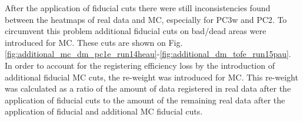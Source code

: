 After the application of fiducial cuts there were still inconsistencies found between the heatmaps of real data and MC, especially for PC3w and PC2. 
To circumvent this problem additional fiducial cuts on bad/dead areas were introduced for MC. 
These cuts are shown on Fig. \ref{fig:additional_mc_dm_pc1e_run14heau}-\ref{fig:additional_dm_tofe_run15pau}. 
In order to account for the registering efficiency loss by the introduction of additional fiducial MC cuts, the re-weight was introduced for MC. 
This re-weight was calculated as a ratio of the amount of data registered in real data after the application of fiducial cuts to the amount of the remaining real data after the application of fiducial and additional MC fiducial cuts.
